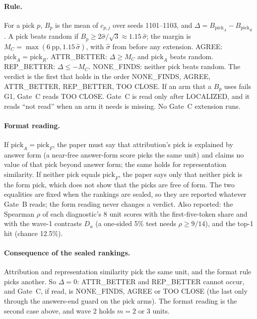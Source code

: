 \documentclass{article}
\theoremstyle{plain}
\theoremstyle{definition}
\theoremstyle{remark}
\begin{document}
\paragraph{Rule.}
For a pick $p$, $B_p$ is the mean of $c_{p,j}$ over seeds 1101--1103, and
$\Delta = B_{\mathrm{pick}_A} - B_{\mathrm{pick}_R}$. A pick beats random if
$B_p \ge 2\hat\sigma/\sqrt{3} \approx 1.15\,\hat\sigma$; the margin is
$M_C = \max(6\ \mathrm{pp}, 1.15\,\hat\sigma)$, with $\hat\sigma$ from before
any extension. AGREE: $\mathrm{pick}_A = \mathrm{pick}_R$. ATTR\_BETTER:
$\Delta \ge M_C$ and $\mathrm{pick}_A$ beats random. REP\_BETTER:
$\Delta \le -M_C$. NONE\_FINDS: neither pick beats random. The verdict is the
first that holds in the order NONE\_FINDS, AGREE, ATTR\_BETTER, REP\_BETTER,
TOO CLOSE. If an arm that a $B_p$ uses fails G1, Gate~C reads TOO CLOSE.
Gate~C is read only after LOCALIZED, and it reads ``not read'' when an arm it
needs is missing. No Gate~C extension runs.

\paragraph{Format reading.}
If $\mathrm{pick}_A = \mathrm{pick}_F$, the paper must say that attribution's
pick is explained by answer form (a near-free answer-form score picks the same
unit) and claims no value of that pick beyond answer form; the same holds for
representation similarity. If neither pick equals $\mathrm{pick}_F$, the paper
says only that neither pick is the form pick, which does not show that the
picks are free of form. The two equalities are fixed when the rankings are
sealed, so they are reported whatever Gate~B reads; the form reading never
changes a verdict. Also reported: the Spearman $\rho$ of each diagnostic's 8
unit scores with the first-five-token share and with the wave-1 contrasts
$D_u$ (a one-sided 5\% test needs $\rho \ge 9/14$), and the top-1 hit (chance
12.5\%).

\paragraph{Consequence of the sealed rankings.}
Attribution and representation similarity pick the same unit, and the format
rule picks another. So $\Delta = 0$: ATTR\_BETTER and REP\_BETTER cannot occur,
and Gate~C, if read, is NONE\_FINDS, AGREE or TOO CLOSE (the last only through
the answers-end guard on the pick arms). The format reading is the second case
above, and wave 2 holds $m = 2$ or 3 units.
\end{document}
